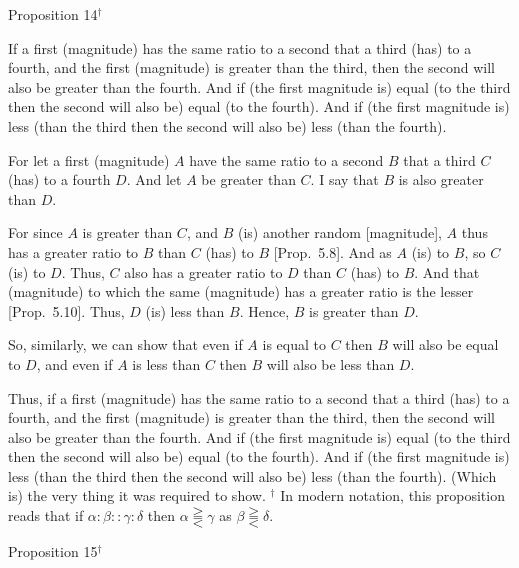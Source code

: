 
\begin{center}
{\large Proposition 14}$^\dag$
\end{center}

If a first (magnitude) has the same ratio to a second  that a third (has) to a fourth, and the first (magnitude) is greater than the third,
then the second will also be greater than the fourth. And if (the first magnitude is) equal
(to the third then the second will also be) equal (to the fourth). And
if (the first magnitude is) less (than the third then the second will also be) less (than the fourth).

\epsfysize=0.5in
\centerline{}

For let a first (magnitude) $A$ have the same ratio to a second $B$  that a
third $C$ (has) to a fourth $D$. And let $A$ be greater than $C$. I say that $B$
is also greater than $D$.

For since $A$ is greater than $C$, and $B$ (is) another random [magnitude],
$A$ thus has a greater ratio to $B$ than $C$ (has) to $B$ [Prop.~5.8]. And as $A$ (is) to $B$, so $C$ (is) to
$D$. Thus, $C$ also has a greater ratio to $D$ than $C$ (has) to $B$. And that (magnitude) to
which the same (magnitude) has a greater ratio is the lesser
 [Prop.~5.10]. Thus, $D$
(is) less than $B$. Hence, $B$ is greater than $D$.

So, similarly, we can show that even if $A$ is equal to $C$ then $B$ will also be equal to $D$, and even if $A$ is less than $C$ then $B$ will also be less than $D$.

Thus, if a first (magnitude) has the same ratio to a second  that a third (has) to a fourth, and the first (magnitude) is greater than the third,
then the second will also be greater than the fourth. And if (the first magnitude is) equal
(to the third then the second will also be) equal (to the fourth). And
if (the first magnitude  is) less (than the third then the second will also be) less (than the fourth). (Which is) the very thing it was required to show.
{\footnotesize \noindent$^\dag$ In modern notation, this proposition
reads that if $\alpha:\beta::\gamma:\delta$ then $\alpha \gtreqqless \gamma$ as
$\beta\gtreqqless\delta$.}


\begin{center}
{\large Proposition 15}$^\dag$
\end{center}

